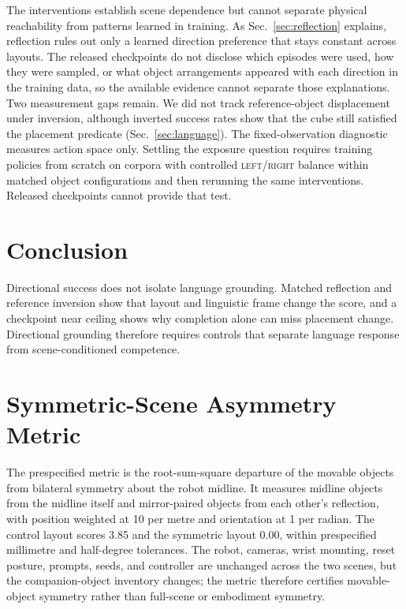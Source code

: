 \documentclass[letterpaper,10pt,conference]{ieeeconf}%
\newcommand{\tokLR}{\textsc{left}/\textsc{right}}
\begin{document}
The interventions establish scene dependence but cannot separate physical reachability from patterns learned in training.
As Sec.~\ref{sec:reflection} explains, reflection rules out only a learned direction preference that stays constant across layouts.
The released checkpoints do not disclose which episodes were used, how they were sampled, or what object arrangements appeared with each direction in the training data, so the available evidence cannot separate those explanations.
Two measurement gaps remain.
We did not track reference-object displacement under inversion, although inverted success rates show that the cube still satisfied the placement predicate (Sec.~\ref{sec:language}).
The fixed-observation diagnostic measures action space only.
Settling the exposure question requires training policies from scratch on corpora with controlled \tokLR{} balance within matched object configurations and then rerunning the same interventions.
Released checkpoints cannot provide that test.

\section{Conclusion}
\label{sec:conclusion}

Directional success does not isolate language grounding.
Matched reflection and reference inversion show that layout and linguistic frame change the score, and a checkpoint near ceiling shows why completion alone can miss placement change.
Directional grounding therefore requires controls that separate language response from scene-conditioned competence.




\appendices
\section{Symmetric-Scene Asymmetry Metric}
\label{app:symmetry_metric}

The prespecified metric is the root-sum-square departure of the movable objects from bilateral symmetry about the robot midline.
It measures midline objects from the midline itself and mirror-paired objects from each other's reflection, with position weighted at 10 per metre and orientation at 1 per radian.
The control layout scores 3.85 and the symmetric layout 0.00, within prespecified millimetre and half-degree tolerances.
The robot, cameras, wrist mounting, reset posture, prompts, seeds, and controller are unchanged across the two scenes, but the companion-object inventory changes; the metric therefore certifies movable-object symmetry rather than full-scene or embodiment symmetry.
\end{document}
